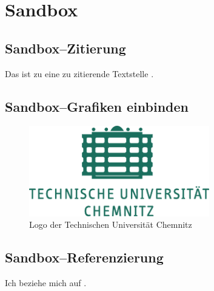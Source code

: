 \section{Sandbox}

\subsection{Sandbox--Zitierung}

Das ist zu eine zu zitierende Textstelle \cite{Klocke2008}.

\subsection{Sandbox--Grafiken einbinden}

\begin{figure}[htbp] 
  \centering
     \includegraphics[width=0.7\textwidth]{img/logo_tuc.pdf}
  \caption{Logo der Technischen Universität Chemnitz}
  \label{fig:Bild1}
\end{figure}

\newpage

\newpage


\subsection{Sandbox--Referenzierung}

Ich beziehe mich auf .